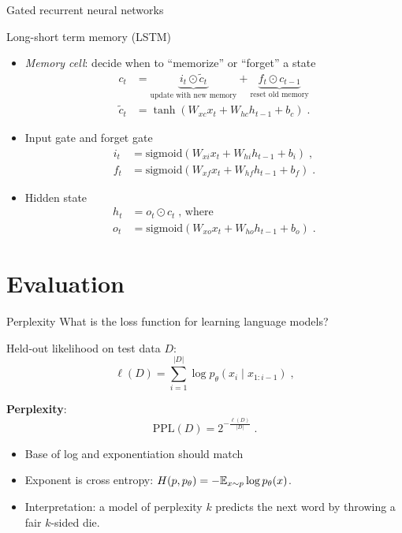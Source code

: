 \documentclass[usenames,dvipsnames,notes]{beamer}
\begin{document}
\begin{frame}
    {Gated recurrent neural networks}

    Long-short term memory (LSTM)\\
    \begin{itemize}
        \item \emph{Memory cell}: decide when to ``memorize'' or ``forget'' a state
            \begin{align*}
                c_t &= \underbrace{i_t \odot \tilde{c}_t}_{\text{update with new memory}} +
     \underbrace{f_t \odot c_{t-1}}_{\text{reset old memory}}\\
                \tilde{c}_t &= \tanh(W_{xc}x_t + W_{hc}h_{t-1} + b_c) \;.
            \end{align*}

            \item Input gate and forget gate
            \begin{align*}
 i_t &= \text{sigmoid}(W_{xi}x_t + W_{hi}h_{t-1} + b_i) \;,\\
 f_t &= \text{sigmoid}(W_{xf}x_t + W_{hf}h_{t-1} + b_f) \;.
            \end{align*}

            \item Hidden state
            \begin{align*}
 h_t &= o_t \odot c_t \;\text{, where} \\
 o_t &= \text{sigmoid}(W_{xo}x_t + W_{ho}h_{t-1} + b_o) \;.
            \end{align*}
    \end{itemize}
\end{frame}

\section{Evaluation}
\begin{frame}
    {Perplexity}
    What is the loss function for learning language models?

    Held-out likelihood on test data $D$:
    $$
    \ell({D}) = \sum_{i=1}^{|D|} \log p_\theta(x_i\mid x_{1:i-1}) \;,
    $$

    \textbf{Perplexity}:
    $$
 \text{PPL}(D) = 2^{-\frac{\ell(D)}{|D|}} \;.
 $$
    \begin{itemize}
        \item Base of log and exponentiation should match
        \item Exponent is cross entropy: $H(p, p_\theta) = -\mathbb{E}_{x\sim p}\log p_\theta(x)$.
        \item Interpretation: a model of perplexity $k$ predicts the next word by throwing a fair $k$-sided die.
    \end{itemize}
\end{frame}
\end{document}
